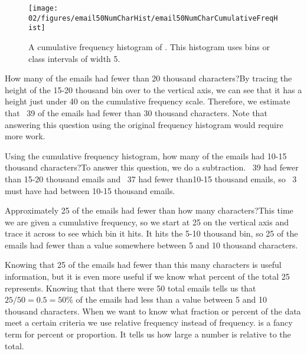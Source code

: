 {\begin{figure}[bth]
   \centering
   \texttt{[image: 02/figures/email50NumCharHist/email50NumCharCumulativeFreqHist]}
   \caption{A cumulative frequency histogram of .  This histogram uses bins or class intervals of width 5. }
   \label{email50NumCharCumulativeFreqHist}
\end{figure}

\begin{example}{How many of the emails had fewer than 20 thousand characters?}By tracing the height of the 15-20 thousand bin over to the vertical axis, we can see that it has a height just under 40 on the cumulative frequency scale.  Therefore, we estimate that  ~39 of the emails had fewer than 30 thousand characters.  Note that answering this question using the original frequency histogram would require more work.
\end{example}

\begin{example}{Using the cumulative frequency histogram, how many of the emails had 10-15 thousand characters?}To answer this question, we do a subtraction.  ~39 had fewer than 15-20 thousand emails and ~37 had fewer than10-15 thousand emails, so ~3 must have had between  10-15 thousand emails.  
\end{example}

\begin{example}{Approximately 25 of the emails had fewer than how many characters?}This time we are given a cumulative frequency, so we start at 25 on the vertical axis and trace it across to see which bin it hits.  It hits the 5-10 thousand bin, so 25 of the emails had fewer than a value somewhere between 5 and 10 thousand characters.
\end{example}

Knowing that 25 of the emails had fewer than this many characters is useful information, but it is even more useful if we know what percent of the total 25 represents.  Knowing that that there were 50 total emails tells us that $25 / 50 = 0.5 = 50\%$ of the emails had less than a value between 5 and 10 thousand characters.  When we want to know what fraction or percent of the data meet a certain criteria we use relative frequency instead of frequency.   is a fancy term for percent or proportion.  It tells us how large a number is relative to the total.  

}
